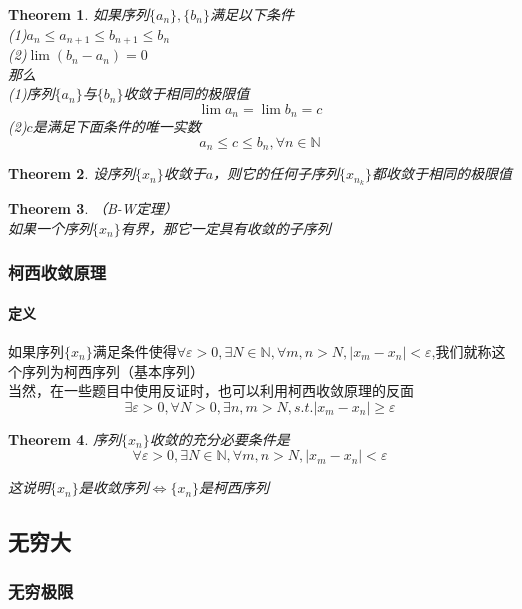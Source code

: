 \documentclass[11pt,hyperref,a4paper,UTF8]{ctexart}
\newtheorem{theorem}{Theorem}[subsection]
\begin{document}
\begin{CJK}{UTF8}{gkai}
\begin{theorem}
如果序列$\{a_n\},\{b_n\}$满足以下条件\\

(1)$a_n\leq a_{n+1}\leq b_{n+1}\leq b_n$\\

(2)$\lim(b_n-a_n)=0$\\

那么\\

(1)序列$\{a_n\}$与$\{b_n\}$收敛于相同的极限值
\[\lim a_n=\lim b_n=c\]
(2)$c$是满足下面条件的唯一实数
\[a_n\leq c\leq b_n,\forall n\in \mathbb{N}\]
\end{theorem}
\begin{theorem}
设序列$\{x_n\}$收敛于$a$，则它的任何子序列$\{x_{n_k}\}$都收敛于相同的极限值\\
\end{theorem}
\begin{theorem}（B-W定理）\\
如果一个序列$\{x_n\}$有界，那它一定具有收敛的子序列\\
\subsubsection{柯西收敛原理}
\end{theorem}
\paragraph{定义\\}
如果序列$\{x_n\}$满足条件使得$\forall \varepsilon>0,\exists N\in \mathbb{N},\forall m,n>N,|x_m-x_n|<\varepsilon$,我们就称这个序列为柯西序列（基本序列）\\

当然，在一些题目中使用反证时，也可以利用柯西收敛原理的反面
\[\exists \varepsilon>0,\forall N>0,\exists n,m>N,s.t. |x_m-x_n|\geq \varepsilon\]
\begin{theorem}
序列$\{x_n\}$收敛的充分必要条件是
\[\forall \varepsilon>0,\exists N\in \mathbb{N},\forall m,n>N,|x_m-x_n|<\varepsilon\]

这说明$\{x_n\}$是收敛序列$\Leftrightarrow\{x_n\}$是柯西序列\\
\end{theorem}
\subsection{无穷大}

\subsubsection{无穷极限}

\end{CJK}
\end{document}
